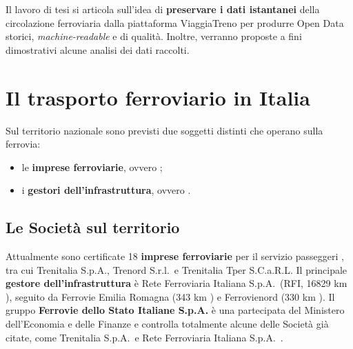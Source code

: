 \documentclass[12pt,italian]{report}
\begin{document}
Il lavoro di tesi si articola sull’idea di \textbf{preservare i dati
    istantanei} della circolazione ferroviaria dalla piattaforma
ViaggiaTreno per produrre Open Data storici, \textit{machine-readable}
e di qualità.  Inoltre, verranno proposte a fini dimostrativi alcune
analisi dei dati raccolti.

\section{Il trasporto ferroviario in Italia}

Sul territorio nazionale sono previsti due soggetti distinti che
operano sulla ferrovia:
\begin{itemize}
	\item le \textbf{imprese ferroviarie}, ovvero ;
	\item i \textbf{gestori dell'infrastruttura}, ovvero
    .
\end{itemize}

\subsection{Le Società sul territorio}

Attualmente sono certificate 18 \textbf{imprese ferroviarie} per il
servizio passeggeri \cite{ElencoIF}, tra cui Trenitalia S.p.A.,
Trenord S.r.l.\ e Trenitalia Tper S.C.a.R.L.  Il principale
\textbf{gestore dell'infrastruttura} è Rete Ferroviaria Italiana
S.p.A.\ (RFI, 16829 km \cite{RfiKm}), seguito da Ferrovie Emilia
Romagna (343 km \cite{FerKm}) e Ferrovienord (330 km
\cite{FerNordKm}).  Il gruppo \textbf{Ferrovie dello Stato Italiane
    S.p.A.} è una partecipata del Ministero dell'Economia e delle
Finanze \cite{MefGruppoFS} e controlla totalmente alcune delle Società
già citate, come Trenitalia S.p.A.\ e Rete Ferroviaria Italiana
S.p.A.\ \cite{ControllateFS}.
\end{document}
